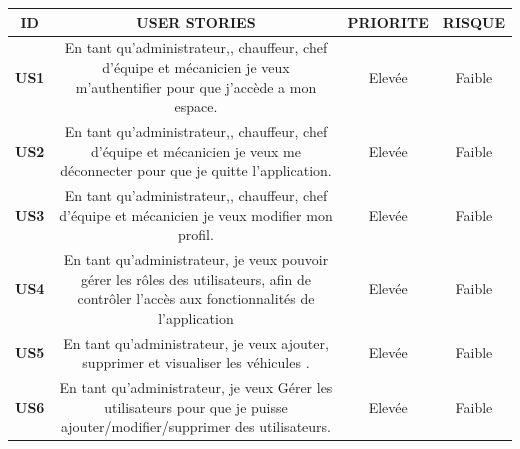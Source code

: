 






\begin{table}[htbp]
  \centering
  \renewcommand{\arraystretch}{4.15} %
  \begin{tabular}{|c|c|c|c|}
    \hline
    \textbf{ID}   & \textbf{USER STORIES}                                                                                                                                                            & \textbf{PRIORITE} & \textbf{RISQUE} \\


    \hline
    \textbf{US1}  & \parbox{9cm}{\centering En tant qu’administrateur,, chauffeur, chef d'équipe et mécanicien je veux m'authentifier pour que j'accède a mon espace.}                               & Elevée            & Faible          \\
    \hline
    \textbf{US2}  & \parbox{9cm}{\centering En tant qu’administrateur,, chauffeur, chef d'équipe et mécanicien je veux me déconnecter pour que je quitte l'application.}                             & Elevée            & Faible          \\
    \hline
    \textbf{US3}  & \parbox{9cm}{\centering En tant qu’administrateur,, chauffeur, chef d'équipe et mécanicien je veux modifier mon profil.}                                                         & Elevée            & Faible          \\
    \hline
    \textbf{US4}  & \parbox{9cm}{\centering En tant qu'administrateur, je veux pouvoir gérer les rôles des utilisateurs, afin de contrôler l'accès aux fonctionnalités de l'application}             & Elevée            & Faible          \\
    \hline
    \textbf{US5}  & \parbox{9cm}{\centering En tant qu'administrateur, je veux ajouter, supprimer et  visualiser les véhicules .}                                                                    & Elevée            & Faible          \\
    \hline
    \textbf{US6}  & \parbox{9cm}{\centering En tant qu’administrateur, je veux Gérer les utilisateurs pour que je puisse ajouter/modifier/supprimer des utilisateurs. }                              & Elevée            & Faible          \\



\end{tabular}
\end{table}
